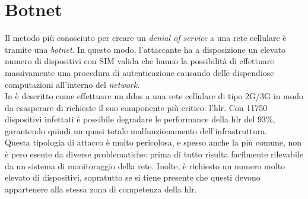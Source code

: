 \section{Botnet}
Il metodo più conosciuto per creare un \textit{denial of service} a una rete cellulare è tramite una \textit{botnet}.
In questo modo, l'attaccante ha a disposizione un elevato numero di dispositivi con SIM valida che hanno la possibilità di effettuare massivamente una procedura
di autenticazione causando delle dispendiose computazioni all'interno del \textit{network}.\\
In \cite{measuring-dos} è descritto come effettuare un \gls{ddos} a una rete cellulare di tipo 2G/3G in modo da esasperare di richieste il suo componente più critico: l'\gls{hlr}.
Con 11750 dispositivi infettati è possibile degradare le performance della \gls{hlr} del 93\%\cite{measuring-dos}, garantendo quindi un quasi totale malfunzionamento dell'infrastruttura.\\
Questa tipologia di attacco è molto pericolosa, e spesso anche la più comune, non è pero esente da diverse problematiche: prima di tutto risulta facilmente rilevabile da un sistema di 
monitoraggio della rete. Inolte, è richiesto un numero molto elevato di dispositivi, sopratutto se si tiene presente che questi devono 
appartenere alla stessa zona di competenza della \gls{hlr}.\\

